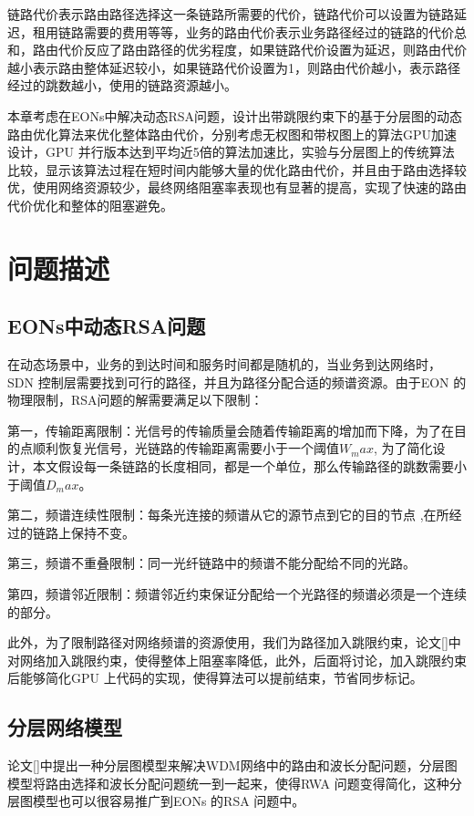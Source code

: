 链路代价表示路由路径选择这一条链路所需要的代价，链路代价可以设置为链路延迟，租用链路需要的费用等等，业务的路由代价表示业务路径经过的链路的代价总和，路由代价反应了路由路径的优劣程度，如果链路代价设置为延迟，则路由代价越小表示路由整体延迟较小，如果链路代价设置为1，则路由代价越小，表示路径经过的跳数越小，使用的链路资源越小。
 
本章考虑在EONs中解决动态RSA问题，设计出带跳限约束下的基于分层图的动态路由优化算法来优化整体路由代价，分别考虑无权图和带权图上的算法GPU加速设计，GPU 并行版本达到平均近5倍的算法加速比，实验与分层图上的传统算法比较，显示该算法过程在短时间内能够大量的优化路由代价，并且由于路由选择较优，使用网络资源较少，最终网络阻塞率表现也有显著的提高，实现了快速的路由代价优化和整体的阻塞避免。
\section{问题描述}
\subsection{EONs中动态RSA问题}
  
在动态场景中，业务的到达时间和服务时间都是随机的，当业务到达网络时，SDN 控制层需要找到可行的路径，并且为路径分配合适的频谱资源。由于EON 的物理限制，RSA问题的解需要满足以下限制：

第一，传输距离限制：光信号的传输质量会随着传输距离的增加而下降，为了在目的点顺利恢复光信号，光链路的传输距离需要小于一个阈值$W_max$, 为了简化设计，本文假设每一条链路的长度相同，都是一个单位，那么传输路径的跳数需要小于阈值$D_max$。

第二，频谱连续性限制：每条光连接的频谱从它的源节点到它的目的节点 ,在所经过的链路上保持不变。

第三，频谱不重叠限制：同一光纤链路中的频谱不能分配给不同的光路。

第四，频谱邻近限制：频谱邻近约束保证分配给一个光路径的频谱必须是一个连续的部分。

此外，为了限制路径对网络频谱的资源使用，我们为路径加入跳限约束，论文[]中对网络加入跳限约束，使得整体上阻塞率降低，此外，后面将讨论，加入跳限约束后能够简化GPU 上代码的实现，使得算法可以提前结束，节省同步标记。
\subsection{分层网络模型}
  
论文[]中提出一种分层图模型来解决WDM网络中的路由和波长分配问题，分层图模型将路由选择和波长分配问题统一到一起来，使得RWA 问题变得简化，这种分层图模型也可以很容易推广到EONs 的RSA 问题中。

